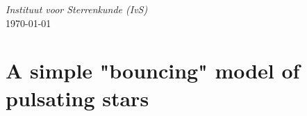 \documentclass[12pt]{article}
\begin{document}
\begin{titlepage}
\large \textit{Instituut voor Sterrenkunde (IvS)}\\[0.3cm]



{\large \today}\\[2cm] %


\vfill %

\end{titlepage}
\setlength{\parindent}{0pt}
\tableofcontents
\newpage

\section{A simple "bouncing" model of pulsating stars}
\end{document}
